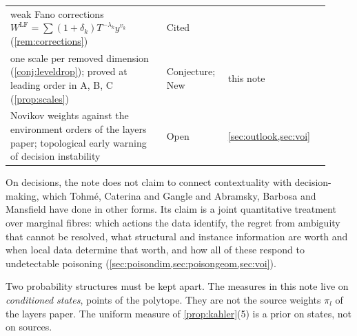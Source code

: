 \documentclass[11pt]{article}
\theoremstyle{definition}\newtheorem{definition}[theorem]{Definition}\newtheorem{remark}[theorem]{Remark}\newtheorem{example}[theorem]{Example}\newtheorem{problem}[theorem]{Open problem}\crefname{problem}{Problem}{Problems}
\begin{document}
{\begin{longtable}{p{0.46\linewidth}p{0.16\linewidth}p{0.3\linewidth}}
\rowcolor{stCited} weak Fano corrections $W^{\mathrm{LF}}=\sum(1+\delta_k)T^{-\lambda_k}y^{v_k}$ (\cref{rem:corrections}) & Cited & \cite{CLLT2020}\\
\rowcolor{stNew} one scale per removed dimension (\cref{conj:leveldrop}); proved at leading order in A, B, C (\cref{prop:scales}) & Conjecture; New & this note\\
Novikov weights against the environment orders of the layers paper; topological early warning of decision instability & Open & \cref{sec:outlook,sec:voi}\\\bottomrule
\end{longtable}}
On decisions, the note does not claim to connect contextuality with decision-making, which Tohm\'e, Caterina and Gangle and Abramsky, Barbosa and Mansfield have done in other forms. Its claim is a joint quantitative treatment over marginal fibres: which actions the data identify, the regret from ambiguity that cannot be resolved, what structural and instance information are worth and when local data determine that worth, and how all of these respond to undetectable poisoning (\cref{sec:poisondim,sec:poisongeom,sec:voi}).

Two probability structures must be kept apart. The measures in this note live on \emph{conditioned states}, points of the polytope. They
are not the source weights $\pi_l$ of the layers paper. The uniform measure of \cref{prop:kahler}(5) is a prior on states, not on sources.
\end{document}

